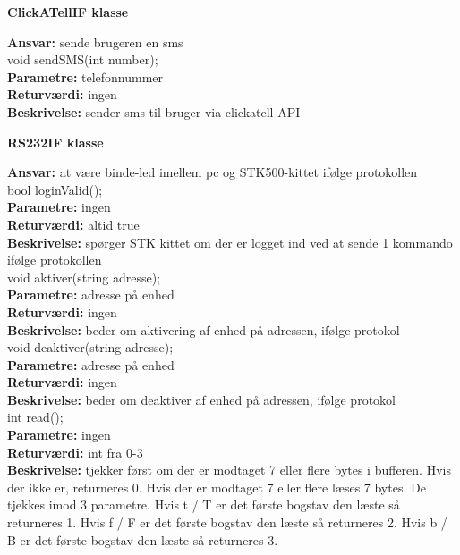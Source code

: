 \newpage

{\centering 
\textbf{ClickATellIF klasse}\par
}
\textbf{Ansvar:} sende brugeren en sms \\

void sendSMS(int number); \\
\textbf{Parametre:} telefonnummer \\
\textbf{Returværdi:} ingen \\
\textbf{Beskrivelse:} sender sms til bruger via clickatell API \\

{\centering 
\textbf{RS232IF klasse}\par
}
\textbf{Ansvar:} at være binde-led imellem pc og STK500-kittet ifølge protokollen \\

bool loginValid(); \\
\textbf{Parametre:} ingen \\
\textbf{Returværdi:} altid true\\
\textbf{Beskrivelse:} spørger STK kittet om der er logget ind ved at sende 1 kommando ifølge protokollen \\

void aktiver(string adresse); \\
\textbf{Parametre:} adresse på enhed \\
\textbf{Returværdi:} ingen \\
\textbf{Beskrivelse:} beder om aktivering af enhed på adressen, ifølge protokol \\

void deaktiver(string adresse); \\
\textbf{Parametre:} adresse på enhed \\
\textbf{Returværdi:} ingen \\
\textbf{Beskrivelse:} beder om deaktiver af enhed på adressen, ifølge protokol \\

int read(); \\
\textbf{Parametre:} ingen\\
\textbf{Returværdi:} int fra 0-3 \\
\textbf{Beskrivelse:} tjekker først om der er modtaget 7 eller flere bytes i bufferen. Hvis der ikke er, returneres 0. Hvis der er modtaget 7 eller flere læses 7 bytes. De tjekkes imod 3 parametre. Hvis t / T er det første bogstav den læste så returneres 1. Hvis f / F er det første bogstav den læste så returneres 2. Hvis b / B er det første bogstav den læste så returneres 3.  

